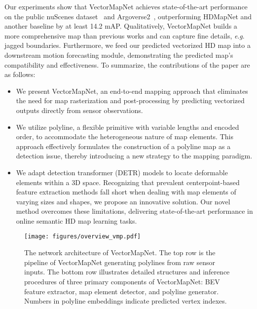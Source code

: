 \documentclass{article}
\newcommand{\eg}{\textit{e}.\textit{g}. }
\theoremstyle{plain}
\theoremstyle{definition}
\theoremstyle{remark}
\begin{document}
Our experiments show that VectorMapNet achieves state-of-the-art performance on the public nuScenes dataset~\citep{caesar2020nuscenes} and Argoverse2~\citep{Argoverse2}, outperforming HDMapNet and another baseline by at least 14.2 mAP. 
Qualitatively, VectorMapNet builds a more comprehensive map than previous works and can capture fine details, \eg jagged boundaries.
Furthermore, we feed our predicted vectorized HD map into a downstream motion forecasting module, demonstrating the predicted map's compatibility and effectiveness. To summarize, the contributions of the paper are as follows:
\begin{itemize}[leftmargin=*]
    \vspace{-1em}
    \setlength\itemsep{0em}
    \item We present VectorMapNet, an end-to-end mapping approach that eliminates the need for map rasterization and post-processing by predicting vectorized outputs directly from sensor observations.
    \item We utilize polyline, a flexible primitive with variable lengths and encoded order, to accommodate the heterogeneous nature of map elements. This approach effectively formulates the construction of a polyline map as a detection issue, thereby introducing a new strategy to the mapping paradigm.
    \item We adapt detection transformer (DETR) models to locate deformable elements within a 3D space. Recognizing that prevalent centerpoint-based feature extraction methods fall short when dealing with map elements of varying sizes and shapes, we propose an innovative solution. Our novel method overcomes these limitations, delivering state-of-the-art performance in online semantic HD map learning tasks.
\end{itemize} 

\begin{figure*}[htp]
    \centering
    \texttt{[image: figures/overview\_vmp.pdf]}
\caption{The network architecture of VectorMapNet. The top row is the pipeline of VectorMapNet generating polylines from raw sensor inputs. The bottom row illustrates detailed structures and inference procedures of three primary components of VectorMapNet: BEV feature extractor, map element detector, and polyline generator. Numbers in polyline embeddings indicate predicted vertex indexes.
    }
    \label{fig:overview}
    \vspace{-1em}
\end{figure*}
\end{document}
